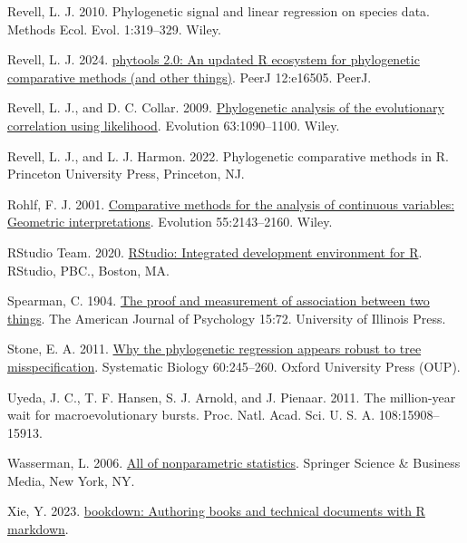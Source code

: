 \documentclass[fleqn,10pt,lineno]{wlpeerj} %
\newlength{\cslhangindent}
\newenvironment{CSLReferences}[2] %
 {\begin{list}{}{%
  \setlength{\itemindent}{0pt}
  \setlength{\leftmargin}{0pt}
  \setlength{\parsep}{0pt}
  \ifodd #1
   \setlength{\leftmargin}{\cslhangindent}
   \setlength{\itemindent}{-1\cslhangindent}
  \fi
  \setlength{\itemsep}{#2\baselineskip}}}
 {\end{list}}
\begin{document}
\begin{CSLReferences}{1}{0}
Revell, L. J. 2010. Phylogenetic signal and linear regression on species data. Methods Ecol. Evol. 1:319--329. Wiley.

Revell, L. J. 2024. \href{https://doi.org/10.7717/peerj.16505}{{p}hytools 2.0: An updated {R} ecosystem for phylogenetic comparative methods (and other things)}. PeerJ 12:e16505. PeerJ.

Revell, L. J., and D. C. Collar. 2009. \href{https://doi.org/10.1111/j.1558-5646.2009.00616.x}{Phylogenetic analysis of the evolutionary correlation using likelihood}. Evolution 63:1090--1100. Wiley.

Revell, L. J., and L. J. Harmon. 2022. Phylogenetic comparative methods in {R}. Princeton University Press, Princeton, NJ.

Rohlf, F. J. 2001. \href{https://doi.org/10.1111/j.0014-3820.2001.tb00731.x}{Comparative methods for the analysis of continuous variables: Geometric interpretations}. Evolution 55:2143--2160. Wiley.

RStudio Team. 2020. \href{http://www.rstudio.com/}{R{S}tudio: Integrated development environment for {R}}. RStudio, PBC., Boston, MA.

Spearman, C. 1904. \href{https://doi.org/10.2307/1412159}{The proof and measurement of association between two things}. The American Journal of Psychology 15:72. University of Illinois Press.

Stone, E. A. 2011. \href{https://doi.org/10.1093/sysbio/syq098}{Why the phylogenetic regression appears robust to tree misspecification}. Systematic Biology 60:245--260. Oxford University Press (OUP).

Uyeda, J. C., T. F. Hansen, S. J. Arnold, and J. Pienaar. 2011. The million-year wait for macroevolutionary bursts. Proc. Natl. Acad. Sci. U. S. A. 108:15908--15913.

Wasserman, L. 2006. \href{https://doi.org/10.1007/0-387-30623-4}{All of nonparametric statistics}. Springer Science \& Business Media, New York, NY.

Xie, Y. 2023. \href{https://github.com/rstudio/bookdown}{{b}ookdown: Authoring books and technical documents with {R} markdown}.


\end{CSLReferences}
\end{document}
